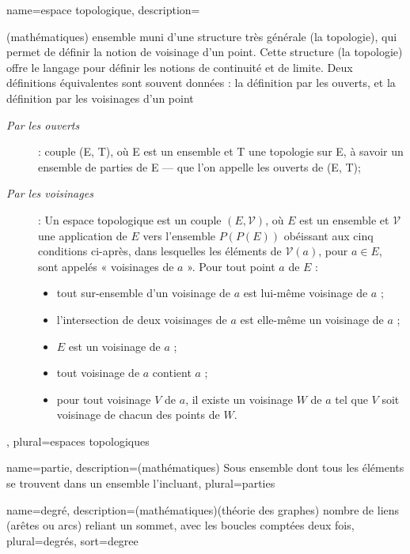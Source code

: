 


{
	name={espace topologique},
	description={(mathématiques) ensemble muni d'une structure très générale (la topologie), qui permet de définir la notion de voisinage d'un point. Cette structure (la topologie) offre le langage pour définir les notions de continuité et de limite. Deux définitions équivalentes sont souvent données : la définition par les ouverts, et la définition par les voisinages d'un point
	\begin{description}
		\item [\emph{Par les ouverts}] : couple (E, T), où E est un ensemble et T une topologie sur E, à savoir un ensemble de parties de E — que l'on appelle les ouverts de (E, T);
		\item [\emph{Par les voisinages}] : Un espace topologique est un couple $(E,\mathcal {V})$, où $E$ est un ensemble et $\mathcal {V}$ une application de $E$ vers l'ensemble $P(P(E))$ obéissant aux cinq conditions ci-après, dans lesquelles les éléments de $\mathcal {V}(a)$, pour $a \in E$, sont appelés « voisinages de $a$ ». Pour tout point $a$ de $E$ :
		\begin{itemize}
			\item tout sur-ensemble d'un voisinage de $a$ est lui-même voisinage de $a$ ;
			\item l'intersection de deux voisinages de $a$ est elle-même un voisinage de $a$ ;
			\item $E$ est un voisinage de $a$ ;
			\item tout voisinage de $a$ contient $a$ ;
			\item pour tout voisinage $V$ de $a$, il existe un voisinage $W$ de $a$ tel que $V$ soit voisinage de chacun des points de $W$.
		\end{itemize}
	\end{description}},
	plural={espaces topologiques}
}

{
	name={partie},
	description={(mathématiques) Sous ensemble dont tous les éléments se trouvent dans un ensemble l'incluant}, 
	plural={parties}
}

{
	name={degr\'e},
	description={(mathématiques)(théorie des graphes) nombre de liens (arêtes ou arcs) reliant un sommet, avec les boucles comptées deux fois}, 
	plural={degr\'es},
	sort={degree}
}

